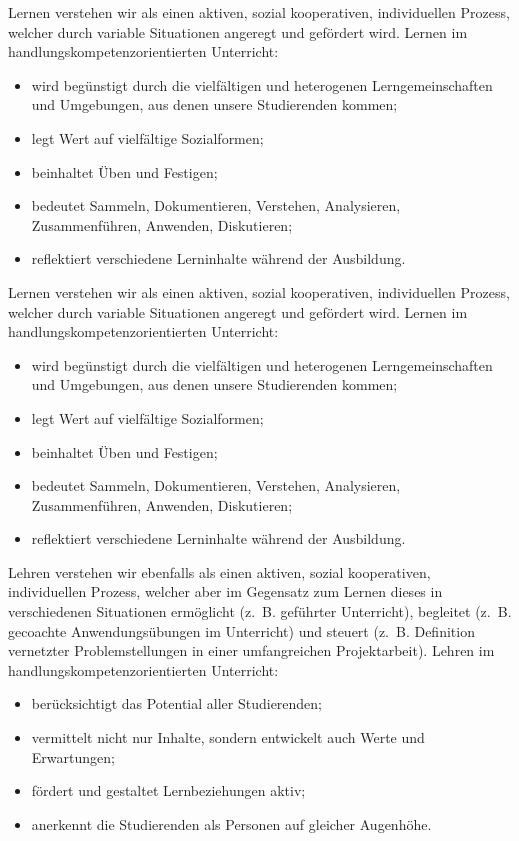 \documentclass[
11pt,
captions=tableheading,
smallheadings,
headsepline,
footsepline, 
captions=tableheading,
parskip=half-,
]{scrartcl}
\begin{document}
Lernen verstehen wir als einen aktiven, sozial kooperativen, individuellen Prozess, welcher durch variable Situationen angeregt und gefördert wird. Lernen im handlungskompetenzorientierten Unterricht:
\begin{itemize}
    \item wird begünstigt durch die vielfältigen und heterogenen Lerngemeinschaften und Umgebungen, aus denen unsere Studierenden kommen;
    \item legt Wert auf vielfältige Sozialformen;
    \item beinhaltet Üben und Festigen;
    \item bedeutet Sammeln, Dokumentieren, Verstehen, Analysieren, Zusammenführen, Anwenden, Diskutieren;
    \item reflektiert verschiedene Lerninhalte während der Ausbildung.
\end{itemize}



Lernen verstehen wir als einen aktiven, sozial kooperativen, individuellen Prozess, welcher durch variable Situationen angeregt und gefördert wird. Lernen im handlungskompetenzorientierten Unterricht:
\begin{itemize}
    \item wird begünstigt durch die vielfältigen und heterogenen Lerngemeinschaften und Umgebungen, aus denen unsere Studierenden kommen;
    \item legt Wert auf vielfältige Sozialformen;
    \item beinhaltet Üben und Festigen;
    \item bedeutet Sammeln, Dokumentieren, Verstehen, Analysieren, Zusammenführen, Anwenden, Diskutieren;
    \item reflektiert verschiedene Lerninhalte während der Ausbildung.
\end{itemize}

Lehren verstehen wir ebenfalls als einen aktiven, sozial kooperativen, individuellen Prozess, welcher aber im Gegensatz zum Lernen dieses in verschiedenen Situationen ermöglicht (z.~B. geführter Unterricht), begleitet (z.~B. gecoachte Anwendungsübungen im Unterricht) und steuert (z.~B. Definition vernetzter Problemstellungen in einer umfangreichen Projektarbeit). Lehren im handlungskompetenzorientierten Unterricht:
\begin{itemize}
    \item berücksichtigt das Potential aller Studierenden;
    \item vermittelt nicht nur Inhalte, sondern entwickelt auch Werte und Erwartungen;
    \item fördert und gestaltet Lernbeziehungen aktiv;
    \item anerkennt die Studierenden als Personen auf gleicher Augenhöhe.
\end{itemize}
\end{document}
